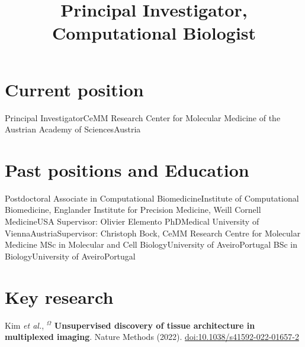 \documentclass[11pt,a4paper,roman]{moderncv} %
\title{Principal Investigator, \newline Computational Biologist}
\begin{document}
\makecvtitle %


\section{Current position}
    {Principal Investigator}{CeMM Research Center for Molecular Medicine of the Austrian Academy of Sciences}{Austria}
    {}{}


\section{Past positions and Education}
        {Postdoctoral Associate in Computational Biomedicine}{Institute of Computational Biomedicine, Englander Institute for Precision Medicine, Weill Cornell Medicine}{USA}
        {}{Supervisor: Olivier Elemento}
        {PhD}{Medical University of Vienna}{Austria}{}{Supervisor: Christoph Bock, CeMM Research Centre for Molecular Medicine}
        {MSc in Molecular and Cell Biology}{University of Aveiro}{Portugal}{}{}
        {BSc in Biology}{University of Aveiro}{Portugal}{}{}




\section{Key research}
        {Kim \textit{et al.}, $^\Omega$ \textbf{Unsupervised discovery of tissue architecture in multiplexed imaging}. Nature Methods (2022). \href{https://doi.org/10.1038/s41592-022-01657-2}{doi:10.1038/s41592-022-01657-2}}
\end{document}
